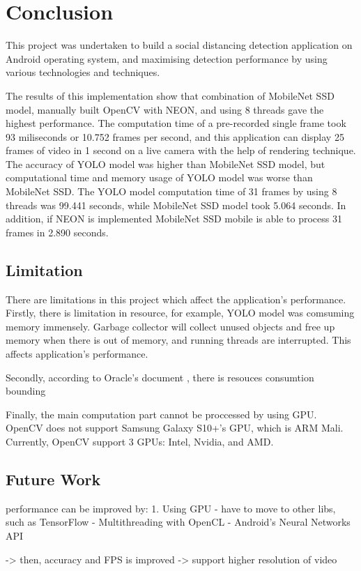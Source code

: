\chapter{Conclusion}\label{conclusion}

    This project was undertaken to build a social distancing detection application on Android operating system,
    and maximising detection performance by using various technologies and techniques.

    The results of this implementation show that combination of MobileNet SSD model,
    manually built OpenCV with NEON, and using 8 threads gave the highest performance.
    The computation time of a pre-recorded single frame took 93 miliseconds or 10.752 frames per second,
    and this application can display 25 frames of video in 1 second on a live camera
    with the help of rendering technique.
    The accuracy of YOLO model was higher than MobileNet SSD model,
    but computational time and memory usage of YOLO model was worse than MobileNet SSD.
    The YOLO model computation time of 31 frames by using 8 threads was 99.441 seconds,
    while MobileNet SSD model took 5.064 seconds.
    In addition, if NEON is implemented MobileNet SSD mobile is able to process 31 frames in 2.890 seconds.

    \section{Limitation}
        There are limitations in this project which affect the application's performance.
        Firstly, there is limitation in resource, for example, YOLO model was comsuming memory immensely.
        Garbage collector will collect unused objects and free up memory when there is out of memory,
        and running threads are interrupted.
        This affects application's performance.

        Secondly, according to Oracle's document \cite{ORACLE-THREAD-POOL}, there is resouces consumtion bounding

        Finally, the main computation part cannot be proccessed by using GPU.
        OpenCV does not support Samsung Galaxy S10+'s GPU, which is ARM Mali.
        Currently, OpenCV support 3 GPUs: Intel, Nvidia, and AMD.

    \section{Future Work}
        performance can be improved by:
            1. Using GPU
                - have to move to other libs, such as TensorFlow
                - Multithreading with OpenCL
                - Android's Neural Networks API

                -> then, accuracy and FPS is improved
                -> support higher resolution of video

